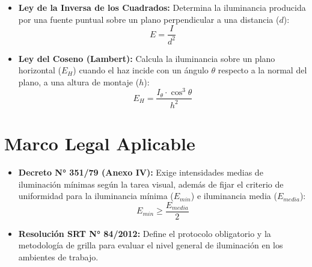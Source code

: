 \begin{itemize}
    \item \textbf{Ley de la Inversa de los Cuadrados:} Determina la iluminancia producida por una fuente puntual sobre un plano perpendicular a una distancia ($d$):
    \begin{equation}
        E = \frac{I}{d^2}
        \label{eq.tp2:inversa_cuadrados}
    \end{equation}
    
    \item \textbf{Ley del Coseno (Lambert):} Calcula la iluminancia sobre un plano horizontal ($E_H$) cuando el haz incide con un ángulo $\theta$ respecto a la normal del plano, a una altura de montaje ($h$):
    \begin{equation}
        E_H = \frac{I_\theta \cdot \cos^3\theta}{h^2}
        \label{eq.tp2:ley_coseno}
    \end{equation}
\end{itemize}

\section{Marco Legal Aplicable}
\label{sec.tp2:marco_legal}

\begin{itemize}
    \item \textbf{Decreto N° 351/79 (Anexo IV):} Exige intensidades medias de iluminación mínimas según la tarea visual, además de fijar el criterio de uniformidad para la iluminancia mínima ($E_{min}$) e iluminancia media ($E_{media}$):
    \begin{equation}
        E_{min} \ge \frac{E_{media}}{2}
        \label{eq.tp2:uniformidad_lim}
    \end{equation}
    
    \item \textbf{Resolución SRT N° 84/2012:} Define el protocolo obligatorio y la metodología de grilla para evaluar el nivel general de iluminación en los ambientes de trabajo.
\end{itemize}
